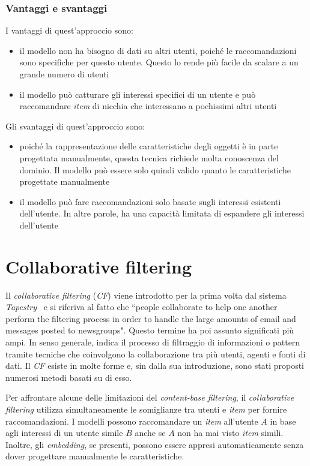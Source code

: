 \subsubsection{Vantaggi e svantaggi}

I vantaggi di quest'approccio sono:
\begin{itemize}
    \item il modello non ha bisogno di dati su altri utenti, poiché le raccomandazioni sono specifiche per questo utente. Questo lo rende più facile da scalare a un grande numero di utenti
    \item il modello può catturare gli interessi specifici di un utente e può raccomandare \textit{item} di nicchia che interessano a pochissimi altri utenti
\end{itemize}

Gli svantaggi di quest'approccio sono:
\begin{itemize}
    \item poiché la rappresentazione delle caratteristiche degli oggetti è in parte progettata manualmente, questa tecnica richiede molta conoscenza del dominio. Il modello può essere solo quindi valido quanto le caratteristiche progettate manualmente
    \item il modello può fare raccomandazioni solo basate sugli interessi esistenti dell'utente. In altre parole, ha una capacità limitata di espandere gli interessi dell'utente
\end{itemize}

\section{Collaborative filtering}
Il \textit{collaborative filtering} (\textit{CF}) viene introdotto per la prima volta dal sistema \textit{Tapestry}~\cite{Tapestry} e si riferiva al fatto che ``people collaborate to help one another perform the filtering process in order to handle the large amounts of email and messages posted to newsgroups". Questo termine ha poi assunto significati più ampi. In senso generale, indica il processo di filtraggio di informazioni o pattern tramite tecniche che coinvolgono la collaborazione tra più utenti, agenti e fonti di dati. Il \textit{CF} esiste in molte forme e, sin dalla sua introduzione, sono stati proposti numerosi metodi basati su di esso.

Per affrontare alcune delle limitazioni del \textit{content-base filtering}, il \textit{collaborative filtering} utilizza simultaneamente le somiglianze tra utenti e \textit{item} per fornire raccomandazioni. I modelli possono raccomandare un \textit{item} all'utente $A$ in base agli interessi di un utente simile $B$ anche se $A$ non ha mai visto \textit{item} simili. Inoltre, gli \textit{embedding}, se presenti, possono essere appresi automaticamente senza dover progettare manualmente le caratteristiche.

